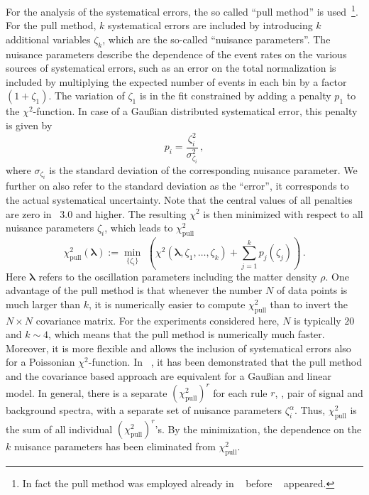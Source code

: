 For the analysis of the systematical errors, the so called 
 ``pull method'' is used~\cite{Fogli:2002pt}\footnote{In fact the pull 
method was employed already in \Ref~\cite{Huber:2002mx} before 
\Ref~\cite{Fogli:2002pt} appeared.}. 
For the pull method, $k$ systematical errors are included by introducing 
$k$ additional variables $\zeta_k$, which are the 
so-called ``nuisance parameters''. 
The nuisance parameters describe the dependence 
of the event rates on the various sources of systematical errors, 
such as an error on the total 
normalization is included by multiplying the expected number of events in 
each bin by a factor $(1+\zeta_1)$. The variation of $\zeta_1$ is in the fit 
constrained by adding a penalty $p_1$ to the $\chi^2$-function. In case 
of a  Gau\ss ian distributed systematical error, this penalty is 
given by
\begin{equation}
\label{eq:penalty}
p_i=\frac{\zeta_i^2}{\sigma_{\zeta_i}^2}\,,
\end{equation}
where $\sigma_{\zeta_i}$ is the standard 
deviation of the corresponding nuisance parameter. We further on also refer
to the  standard deviation as
the ``error'', it corresponds to the actual systematical uncertainty.
Note that the central values of all penalties are zero in \GLOBES\ 3.0 and higher. 
The resulting $\chi^2$ is then minimized with respect to all nuisance 
parameters $\zeta_i$, which leads to $\chi^2_\mathrm{pull}$
\begin{equation}
\chi^2_\mathrm{pull}(\boldsymbol{\lambda}):=\min_{\{\zeta_i\} } \,\, \left( 
\chi^2(\boldsymbol{\lambda},
\zeta_1, \ldots, \zeta_k)+ \sum_{j=1}^{k} p_j(\zeta_j)\right)\,.
\end{equation}
Here $\boldsymbol{\lambda}$ refers to the oscillation parameters 
including the matter density
$\rho$. One advantage of the pull method is that whenever the number $N$ of 
data points is much larger than $k$, it is numerically easier to compute 
$\chi^2_\mathrm{pull}$ than to invert the $N\times N$ covariance matrix. For
the experiments considered here, $N$ is typically $20$ and $k\sim 4$, 
which means that the pull method is numerically much faster. Moreover,
 it is more flexible and  allows the inclusion of systematical errors 
also for a Poissonian $\chi^2$-function.
In \Ref~\cite{Fogli:2002pt}, it has been demonstrated that the pull method 
and the covariance based approach are equivalent for a Gau\ss ian and 
linear model. In general,
there is a separate $(\chi^2_\mathrm{pull})^r$ for each rule $r$, 
\ie , pair of signal and background spectra, with a separate set of 
nuisance parameters $\zeta_i^\alpha$. Thus, $\chi^2_\mathrm{pull}$
is the sum of all individual  $(\chi^2_\mathrm{pull})^r$'s.
By the minimization, the dependence on the $k$ nuisance parameters has been eliminated  from $\chi^2_\mathrm{pull}$. 

